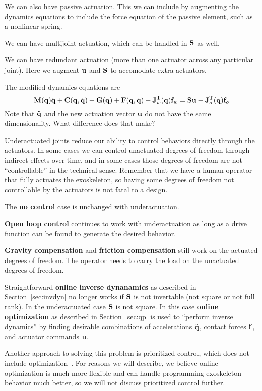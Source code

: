 \documentclass[letterpaper,12pt,fullpage]{article}
\begin{document}
We can also have passive actuation. This we can include by augmenting the
dynamics equations to include the force equation of the passive element,
such as a nonlinear spring.

We can have multijoint actuation, which can be handled in ${\bf S}$ as well.

We can have redundant actuation (more than one actuator across any particular
joint). Here we augment ${\bf u}$ and ${\bf S}$ to accomodate extra actuators.

The modified dynamics equations are
\begin{equation}
{\bf M}({\bf q}) \ddot{{\bf q}} + {\bf C}({\bf q},\dot{{\bf q}}) + {\bf G}({\bf q}) + {\bf F}({\bf q},\dot{{\bf q}})
+ {\bf J}_w^{{\rm T}}({\bf q}) {\bf f}_w = {\bf S} {\bf u} + {\bf J}_o^{{\rm T}}({\bf q}) {\bf f}_o
\label{eq:dynamics2}
\end{equation}
Note that $\ddot{{\bf q}}$ and the new actuation vector ${\bf u}$
do not have the same dimensionality. What difference does that make?

Underactuated joints reduce our ability to control behaviors directly
through the actuators. In some cases we can control unactuated degrees of freedom
through indirect effects over time, and in some cases those degrees of freedom
are not ``controllable'' in the technical sense. Remember that we have a human
operator that fully actuates the exoskeleton, so having some degrees of freedom
not controllable by the actuators is not fatal to a design.

The {\bf no control} case is unchanged with underactuation.

{\bf Open loop control} continues to work with underactuation
as long as a drive function can be found
to generate the desired behavior.

{\bf Gravity compensation} and {\bf friction compensation}
still work on the actuated degrees
of freedom. The operator needs to carry the load on the unactuated degrees of freedom.

Straightforward {\bf online inverse dynanamics} as described in Section~\ref{sec:invdyn}
no longer works if ${\bf S}$ is not invertable (not square or not full rank).
In the underactuated case ${\bf S}$ is not square. In this case {\bf online optimization}
as described in Section~\ref{sec:qp} is used to ``perform inverse dynamics'' by
finding desirable combinations of accelerations $\ddot{{\bf q}}$, contact forces ${\bf f}$,
and actuator commands ${\bf u}$.

Another approach to solving this problem is prioritized control, which does
not include optimization~\cite{}. For reasons we will describe, we believe
online optimization is much more flexible and can handle programming exoskeleton
behavior much better, so we will not discuss prioritized control further.
\end{document}
